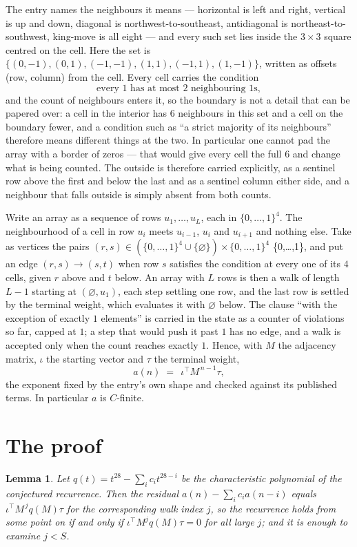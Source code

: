 \documentclass[11pt,a4paper]{article}
\theoremstyle{plain}
\newtheorem{lemma}[theorem]{Lemma}
\theoremstyle{definition}
\begin{document}
The entry names the neighbours it means --- horizontal is left and right, vertical is up and
down, diagonal is northwest-to-southeast, antidiagonal is northeast-to-southwest, king-move is
all eight --- and every such set lies inside the $3\times3$ square centred on the cell. Here
the set is $\{(0,-1), (0,1), (-1,-1), (1,1), (-1,1), (1,-1)\}$, written as offsets (row, column) from the cell. Every cell carries
the condition
\[
\text{every 1 has at most 2 neighbouring 1s},
\]
and the count of neighbours enters it, so the boundary is not a detail that can be papered
over: a cell in the interior has $6$ neighbours in this set and a cell on the boundary
fewer, and a condition such as ``a strict majority of its neighbours'' therefore means
different things at the two. In particular one cannot pad the array with a border of zeros ---
that would give every cell the full $6$ and change what is being counted. The outside is
therefore carried
explicitly, as a sentinel row above the first and below the last and as a sentinel column
either side, and a neighbour that falls outside is simply absent from both counts.

Write an array as a sequence of rows $u_1,\dots,u_L$, each in
$\{0,\dots,1\}^{4}$. The neighbourhood of a cell in row $u_i$ meets $u_{i-1}$,
$u_i$ and $u_{i+1}$ and nothing else. Take as vertices the pairs
$(r,s)\in(\{0,\dots,1\}^{4}\cup\{\varnothing\})\times\{0,\dots,1\}^{4}$ \times \{0,\dots,1\},
and put an edge $(r,s)\to(s,t)$ when row $s$ satisfies the condition at every one of its
$4$ cells, given $r$ above and $t$ below. An array with $L$ rows is then a walk of length
$L-1$ starting at $(\varnothing,u_1)$, each step settling one row, and the last row is
settled by the terminal weight, which evaluates it with $\varnothing$ below. The clause ``with the exception of exactly $1$ elements'' is carried in
the state as a counter of violations so far, capped at $1$; a step that would push it past
$1$ has no edge, and a walk is accepted only when the count reaches exactly $1$. Hence,
with $M$ the adjacency matrix, $\iota$ the starting vector and $\tau$ the terminal weight,
\[
a(n)\;=\;\,\iota^{\!\top}M^{\,n-1}\tau ,
\]
the exponent fixed by the entry's own shape and checked against its published terms. In
particular $a$ is $C$-finite.

\section{The proof}

\begin{lemma}\label{lem:crit}
Let $q(t)=t^{28}-\sum_i c_it^{28-i}$ be the characteristic polynomial of the
conjectured recurrence. Then the residual $a(n)-\sum_ic_ia(n-i)$ equals
$\iota^{\!\top}M^{\,j}q(M)\tau$ for the corresponding walk index $j$, so the
recurrence holds from some point on if and only if $\iota^{\!\top}M^{j}q(M)\tau=0$ for all
large $j$; and it is enough to examine $j<S$.
\end{lemma}
\end{document}
